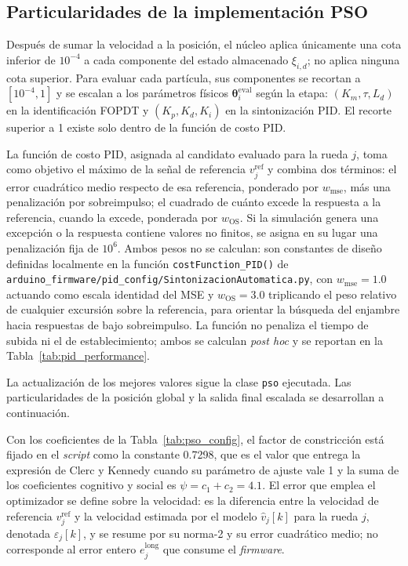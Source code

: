 \begin{appendices}
\subsection{Particularidades de la implementación PSO}
\label{anx:pso_detalle}

Después de sumar la velocidad a la posición, el núcleo aplica únicamente una cota inferior de $10^{-4}$ a cada componente del estado almacenado $\xi_{i,d}$; no aplica ninguna cota superior. Para evaluar cada partícula, sus componentes se recortan a $[10^{-4},1]$ y se escalan a los parámetros físicos $\boldsymbol{\theta}_i^{\mathrm{eval}}$ según la etapa: $(K_m,\tau,L_d)$ en la identificación FOPDT y $(K_p,K_d,K_i)$ en la sintonización PID. El recorte superior a 1 existe solo dentro de la función de costo PID.

La función de costo PID, asignada al candidato evaluado para la rueda $j$, toma como objetivo el máximo de la señal de referencia $v_j^{\mathrm{ref}}$ y combina dos términos: el error cuadrático medio respecto de esa referencia, ponderado por $w_{\mathrm{mse}}$, más una penalización por sobreimpulso; el cuadrado de cuánto excede la respuesta a la referencia, cuando la excede, ponderada por $w_{\mathrm{OS}}$. Si la simulación genera una excepción o la respuesta contiene valores no finitos, se asigna en su lugar una penalización fija de $10^{6}$. Ambos pesos no se calculan: son constantes de diseño definidas
localmente en la función \texttt{costFunction\_PID()} de
\texttt{arduino\_\allowbreak{}firmware/\allowbreak{}pid\_\allowbreak{}config/\allowbreak{}SintonizacionAutomatica.\allowbreak{}py}, con
$w_{\mathrm{mse}}=1.0$ actuando como escala identidad del MSE y
$w_{\mathrm{OS}}=3.0$ triplicando el peso relativo de cualquier excursión
sobre la referencia, para orientar la búsqueda del enjambre hacia respuestas
de bajo sobreimpulso. La función no penaliza el tiempo de subida ni el de
establecimiento; ambos se calculan \textit{post hoc} y se reportan en la
Tabla~\ref{tab:pid_performance}.

La actualización de los mejores valores sigue la clase
\texttt{pso} ejecutada. Las particularidades de la posición global y la salida
final escalada se desarrollan a continuación.

Con los coeficientes de la Tabla~\ref{tab:pso_config}, el factor de constricción está fijado en el \textit{script} como la constante 0.7298, que es el valor que entrega la expresión de Clerc y Kennedy \citep[Ec.~5.3]{clerc2002particle} cuando su parámetro de ajuste vale 1 y la suma de los coeficientes cognitivo y social es $\psi=c_1+c_2=4.1$. El error que emplea el optimizador se define sobre la velocidad: es la diferencia entre la velocidad de referencia $v_j^{\mathrm{ref}}$ y la velocidad estimada por el modelo $\widehat{v}_j[k]$ para la rueda $j$, denotada $\varepsilon_j[k]$, y se resume por su norma-2 y su error cuadrático medio; no corresponde al error entero $e_j^{\mathrm{long}}$ que consume el \textit{firmware}.


\end{appendices}
